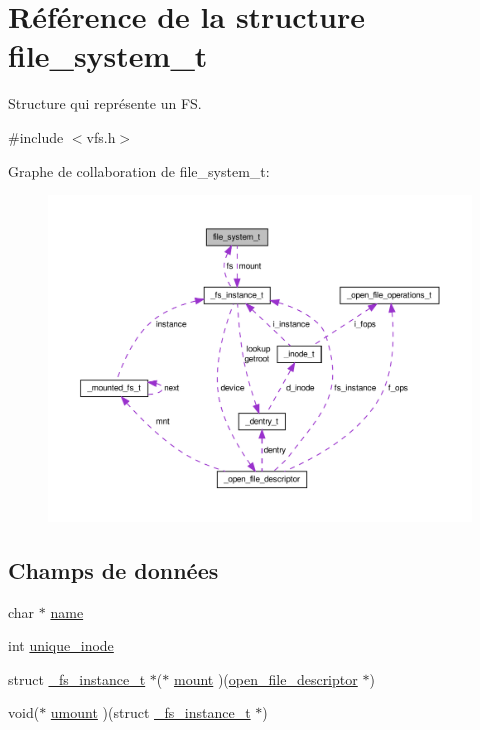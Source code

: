 \hypertarget{structfile__system__t}{\section{Référence de la structure file\-\_\-system\-\_\-t}
\label{structfile__system__t}
}


Structure qui représente un F\-S.  




{\ttfamily \#include $<$vfs.\-h$>$}



Graphe de collaboration de file\-\_\-system\-\_\-t\-:
\nopagebreak
\begin{figure}[H]
\begin{center}
\leavevmode
\includegraphics[width=350pt]{structfile__system__t__coll__graph}
\end{center}
\end{figure}
\subsection*{Champs de données}
\begin{DoxyCompactItemize}
\item 
char $\ast$ \hyperlink{structfile__system__t_a2b7d7c0f769113d1164052beeeca777d}{name}
\item 
int \hyperlink{structfile__system__t_a3cf80f0c2c2b7a9c202d5006e4095eaf}{unique\-\_\-inode}
\item 
struct \hyperlink{struct__fs__instance__t}{\-\_\-fs\-\_\-instance\-\_\-t} $\ast$($\ast$ \hyperlink{structfile__system__t_a7edaed95e6ac68991bbaac6cd07b458b}{mount} )(\hyperlink{struct__open__file__descriptor}{open\-\_\-file\-\_\-descriptor} $\ast$)
\item 
void($\ast$ \hyperlink{structfile__system__t_a899f34d838d88470373b60f7c5f0edd9}{umount} )(struct \hyperlink{struct__fs__instance__t}{\-\_\-fs\-\_\-instance\-\_\-t} $\ast$)
\end{DoxyCompactItemize}


